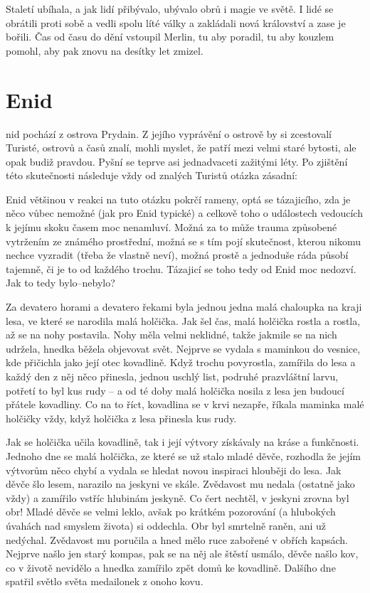 \documentclass[a4paper,twocolumn,openany,nodeprecatedcode, justified]{dndbook}
\begin{document}
	Staletí ubíhala, a jak lidí přibývalo, ubývalo obrů i magie ve světě. I lidé se obrátili proti sobě a vedli spolu líté války a zakládali nová království a zase je bořili. Čas od času do dění vstoupil Merlin, tu aby poradil, tu aby kouzlem pomohl, aby pak znovu na desítky let zmizel.
	
	
	
	
	\chapter{Enid}
	nid pochází z ostrova Prydain. Z jejího vyprávění o ostrově by si zcestovalí Turisté, ostrovů a časů znalí, mohli myslet, že patří mezi velmi staré bytosti, ale opak budiž pravdou. Pyšní se teprve asi jednadvaceti zažitými léty. Po zjištění této skutečnosti následuje vždy od znalých Turistů otázka zásadní: 
	
	Enid většinou v reakci na tuto otázku pokrčí rameny, optá se tázajicího, zda je něco vůbec nemožné (jak pro Enid typické) a celkově toho o událostech vedoucích k jejímu skoku časem moc nenamluví. Možná za to může trauma způsobené vytržením ze známého prostřední, možná se s tím pojí skutečnost, kterou nikomu nechce vyzradit (třeba že vlastně neví), možná prostě a jednoduše ráda působí tajemně, či je to od každého trochu. Tázajicí se toho tedy od Enid moc nedozví. Jak to tedy bylo--nebylo? 
	
	Za devatero horami a devatero řekami byla jednou jedna malá chaloupka na kraji lesa, ve které se narodila malá holčička. Jak šel čas, malá holčička rostla a rostla, až se na nohy postavila. Nohy měla velmi neklidné, takže jakmile se na nich udržela, hnedka běžela objevovat svět. Nejprve se vydala s maminkou do vesnice, kde přičichla jako její otec kovadlině. Když trochu povyrostla, zamířila do lesa a každý den z něj něco přinesla, jednou uschlý list, podruhé prazvláštní larvu, potřetí to byl kus rudy -- a od té doby malá holčička nosila z lesa jen budoucí přátele kovadliny.
	Co na to říct, kovadlina se v krvi nezapře, říkala maminka malé holčičky vždy, když holčička z lesa přinesla kus rudy.
	
	Jak se holčička učila kovadlině, tak i její výtvory získávaly na kráse a funkčnosti. Jednoho dne se malá holčička, ze které se už stalo mladé děvče, rozhodla že jejím výtvorům něco chybí a vydala se hledat novou inspiraci hlouběji do lesa. Jak děvče šlo lesem, narazilo na jeskyni ve skále. Zvědavost mu nedala (ostatně jako vždy) a zamířilo vstříc hlubinám jeskyně. Co čert nechtěl, v jeskyni zrovna byl obr! Mladé děvče se velmi leklo, avšak po krátkém pozorování (a hlubokých úvahách nad smyslem života) si oddechla. Obr byl smrtelně raněn, ani už nedýchal. Zvědavost mu poručila a hned mělo ruce zabořené v obřích kapsách. Nejprve našlo jen starý kompas, pak se na něj ale štěstí usmálo, děvče našlo kov, co v životě nevidělo a hnedka zamířilo zpět domů ke kovadlině. Dalšího dne spatřil světlo světa medailonek z onoho kovu.
	
\end{document}
